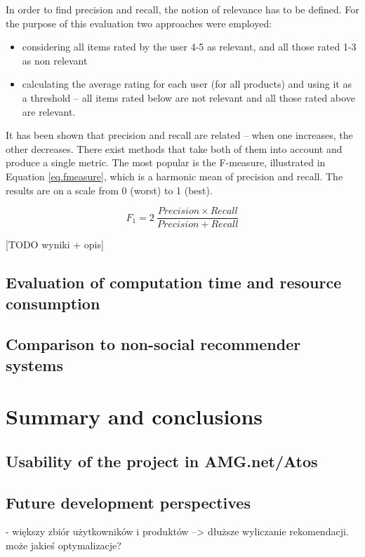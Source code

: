 \documentclass[12pt]{report}
\begin{document}
In order to find precision and recall, the notion of relevance has to be defined. For the purpose of this evaluation two approaches were employed:
\begin{itemize}
\item considering all items rated by the user 4-5 as relevant, and all those rated 1-3 as non relevant
\item calculating the average rating for each user (for all products) and using it as a threshold -- all items rated below are not relevant and all those rated above are relevant.
\end{itemize}

It has been shown that precision and recall are related -- when one increases, the other decreases. There exist methods that take both of them into account and produce a single metric. The most popular is the F-measure, illustrated in Equation \ref{eq.fmeasure}, which is a harmonic mean of precision and recall. The results are on a scale from 0 (worst) to 1 (best).

\begin{equation}
F_1 = 2\:\frac{Precision \times Recall}{Precision + Recall}
\label{eq.fmeasure}
\end{equation}
\hbox{}

[TODO wyniki + opis]

\section{Evaluation of computation time and resource consumption}
\section{Comparison to non-social recommender systems}

\chapter{Summary and conclusions}
\section{Usability of the project in AMG.net/Atos}
\section{Future development perspectives}

- większy zbiór użytkowników i produktów --> dłuższe wyliczanie rekomendacji. może jakieś optymalizacje?\\
\end{document}
